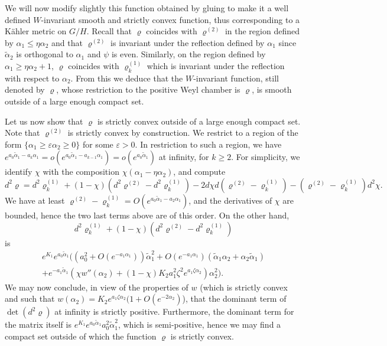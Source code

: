 \documentclass[10pt]{amsart}
\let\epsilon\varepsilon
\theoremstyle{plain}
\theoremstyle{definition}
\newcommand{\ta}{\tilde \alpha}
\newcommand{\rhodeux}{\varrho^{(2)}}
\newcommand{\rhoun}{\varrho^{(1)}}
\begin{document}
We will now modify slightly this function obtained by gluing to make it a well defined $W$-invariant
smooth and strictly convex function, thus corresponding to a Kähler metric on $G/H$.
Recall that $\varrho$ coincides with $\rhodeux$ in the region defined by $\alpha_1\leq \eta\alpha_2$
and that $\rhodeux$ is invariant under the reflection defined by $\alpha_1$ since $\ta_2$ is
orthogonal to $\alpha_1$ and $\psi$ is even. Similarly, on the region defined by
$\alpha_1\geq \eta\alpha_2+1$, $\varrho$ coincides with $\rhoun_k$ which is invariant
under the reflection with respect to $\alpha_2$.
From this we deduce that the $W$-invariant function, still denoted by $\varrho$,
whose restriction to the positive Weyl chamber is $\varrho$, is smooth outside of a
large enough compact set.

Let us now show that $\varrho$ is strictly convex outside of a large enough compact set.
Note that $\rhodeux$ is strictly convex by construction.
We restrict to a region of the form $\{\alpha_1\geq \epsilon \alpha_2\geq 0\}$ for some $\epsilon>0$.
In restriction to such a region, we have $e^{a_0\ta_1-a_k\alpha_1}=o(e^{a_0\ta_1-a_{k-1}\alpha_1})=o(e^{a_0\ta_1})$
at infinity, for $k\geq 2$.
For simplicity, we identify $\chi$ with the composition $\chi(\alpha_1-\eta \alpha_2)$, and compute
\[ d^2\varrho=d^2\rhoun_k +(1-\chi)(d^2\rhodeux-d^2\rhoun_k)-2d\chi d(\rhodeux-\rhoun_k)-(\rhodeux-\rhoun_k)d^2\chi. \]
We have at least $\rhodeux-\rhoun_k=O(e^{a_0\ta_1-a_2\alpha_1})$,
and the derivatives of $\chi$ are bounded, hence the two last terms above are of this order.
On the other hand, $$d^2\rhoun_k +(1-\chi)(d^2\rhodeux-d^2\rhoun_k)$$ is
\begin{multline*}
e^{K_1}e^{a_0\ta_1}\big( (a_0^2+O(e^{-a_1\alpha_1}))\ta_1^2 + O(e^{-a_1\alpha_1})(\ta_1\alpha_2+\alpha_2\ta_1)
\\ +e^{-a_1\ta_1}(\chi w''(\alpha_2)+(1-\chi)K_2a_1^2\zeta^2e^{a_1\zeta\alpha_2})\alpha_2^2 \big).
\end{multline*}
We may now conclude, in view of the properties of $w$ (which is strictly convex and such that
$w(\alpha_2)=K_2e^{a_1\zeta\alpha_2}(1+O(e^{-2\alpha_2})$), that the dominant term of $\det(d^2\varrho)$
at infinity is strictly positive.
Furthermore, the dominant term for the matrix itself is $e^{K_1}e^{a_0\ta_1}a_0^2\ta_1^2$, which is
semi-positive, hence we may find a compact set outside of which the function $\varrho$ is strictly convex.
\end{document}

